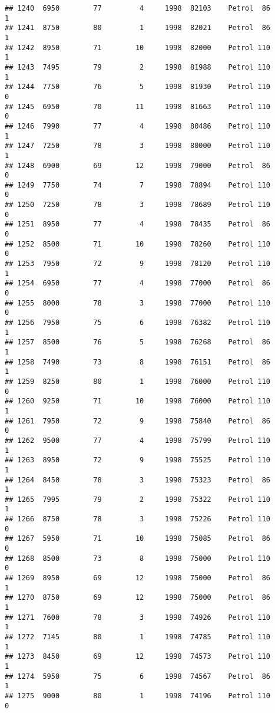 \documentclass[]{article}
\begin{document}
\begin{verbatim}
## 1240  6950        77         4     1998  82103    Petrol  86         1
## 1241  8750        80         1     1998  82021    Petrol  86         1
## 1242  8950        71        10     1998  82000    Petrol 110         1
## 1243  7495        79         2     1998  81988    Petrol 110         1
## 1244  7750        76         5     1998  81930    Petrol 110         0
## 1245  6950        70        11     1998  81663    Petrol 110         0
## 1246  7990        77         4     1998  80486    Petrol 110         1
## 1247  7250        78         3     1998  80000    Petrol 110         1
## 1248  6900        69        12     1998  79000    Petrol  86         0
## 1249  7750        74         7     1998  78894    Petrol 110         0
## 1250  7250        78         3     1998  78689    Petrol 110         0
## 1251  8950        77         4     1998  78435    Petrol  86         0
## 1252  8500        71        10     1998  78260    Petrol 110         0
## 1253  7950        72         9     1998  78120    Petrol 110         1
## 1254  6950        77         4     1998  77000    Petrol  86         0
## 1255  8000        78         3     1998  77000    Petrol 110         0
## 1256  7950        75         6     1998  76382    Petrol 110         1
## 1257  8500        76         5     1998  76268    Petrol  86         1
## 1258  7490        73         8     1998  76151    Petrol  86         1
## 1259  8250        80         1     1998  76000    Petrol 110         0
## 1260  9250        71        10     1998  76000    Petrol 110         1
## 1261  7950        72         9     1998  75840    Petrol  86         0
## 1262  9500        77         4     1998  75799    Petrol 110         1
## 1263  8950        72         9     1998  75525    Petrol 110         1
## 1264  8450        78         3     1998  75323    Petrol  86         1
## 1265  7995        79         2     1998  75322    Petrol 110         1
## 1266  8750        78         3     1998  75226    Petrol 110         0
## 1267  5950        71        10     1998  75085    Petrol  86         0
## 1268  8500        73         8     1998  75000    Petrol 110         0
## 1269  8950        69        12     1998  75000    Petrol  86         1
## 1270  8750        69        12     1998  75000    Petrol  86         1
## 1271  7600        78         3     1998  74926    Petrol 110         1
## 1272  7145        80         1     1998  74785    Petrol 110         1
## 1273  8450        69        12     1998  74573    Petrol 110         1
## 1274  5950        75         6     1998  74567    Petrol  86         1
## 1275  9000        80         1     1998  74196    Petrol 110         0

\end{verbatim}
\end{document}
